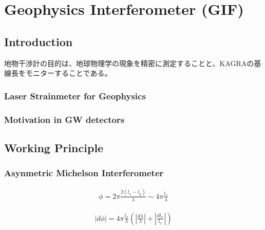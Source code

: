 \chapter{Geophysics Interferometer (GIF)}



\section{Introduction}
地物干渉計の目的は、地球物理学の現象を精密に測定することと、KAGRAの基線長をモニターすることである。
\subsection{Laser Strainmeter for Geophysics}



\subsection{Motivation in GW detectors}


\section{Working Principle}

\subsection{Asynmetric Michelson Interferometer}

\begin{eqnarray} \label{eq:eq401}
  \phi = 2\pi\frac{2(l_x-l_y)}{\lambda}\sim4\pi\frac{l_x}{\lambda}
\end{eqnarray}

\begin{eqnarray}\label{eq:eq402}
  |d\phi| = 4\pi\frac{l_x}{\lambda}\left( \left|\frac{d\lambda}{\lambda}\right| + \left|\frac{dl_x}{l_x}\right| \right)
\end{eqnarray}


